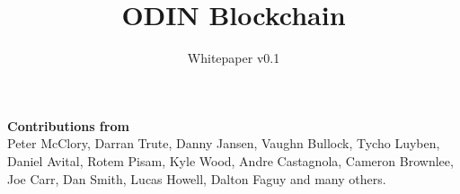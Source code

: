 \documentclass[12pt,letterpaper]{article}
\begin{document}

\title{\Huge ODIN Blockchain}
\author{Whitepaper v0.1}
\maketitle
\fancyfoot{}
\thispagestyle{fancy}
\renewcommand{\headrulewidth}{0pt}
\newpage

\newcommand{\MyPrefaceTitle}{%
\begin{center}
\Large 
\textbf{Contributions from}
\normalsize 
\vspace{1cm}
\\
Peter McClory, Darran Trute, Danny Jansen, Vaughn Bullock, Tycho Luyben, Daniel Avital, Rotem Pisam, Kyle Wood, Andre Castagnola, Cameron Brownlee, Joe Carr, Dan Smith, Lucas Howell, Dalton Faguy and many others.
\end{center}
}
\mbox{}
\MyPrefaceTitle  

\newpage 
{}                                   
\tableofcontents

\pagestyle{fancy}
\lhead{}
\rhead{}
\cfoot{}
\renewcommand{\headrulewidth}{0pt}
\rfoot[R]{\thepage}


\newpage


\newpage


\newpage


\newpage


\newpage




\end{document}
